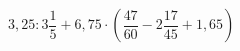 \begin{ex}[type=calculate]
	\begin{condition}
		\( 3,25:3\dfrac{1}{5}+6,75\cdot\left( \dfrac{47}{60}-2\dfrac{17}{45}+1,65 \right) \)
	\end{condition}
	\answer{}
\end{ex}